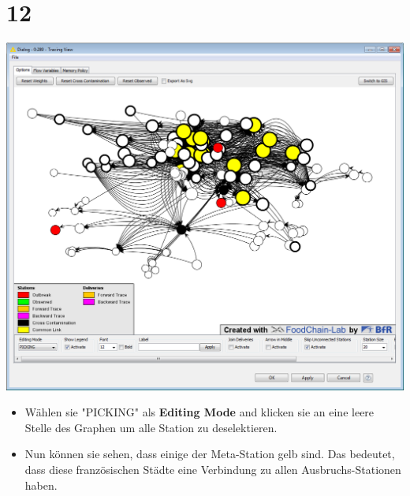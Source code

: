 \documentclass{beamer}
\begin{document}
\section{12}
\begin{frame}
	\begin{center}
  		\includegraphics[height=0.6\textheight]{12.png}
	\end{center}
	\begin{itemize}
		\item Wählen sie "PICKING" als \textbf{Editing Mode} and klicken sie an eine leere Stelle des Graphen um alle Station zu deselektieren.
		\item Nun können sie sehen, dass einige der Meta-Station gelb sind. Das bedeutet, dass diese französischen Städte eine Verbindung zu allen Ausbruchs-Stationen haben.
	\end{itemize}
\end{frame}
\end{document}
